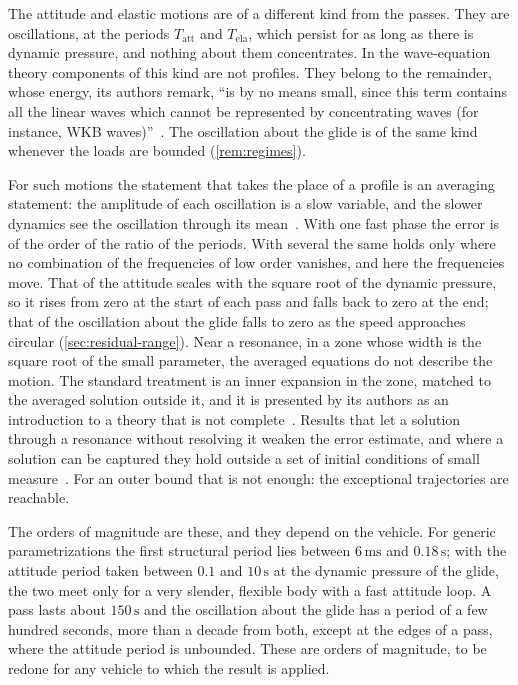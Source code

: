 The attitude and elastic motions are of a different kind from the passes.
They are oscillations, at the periods $T_{\mathrm{att}}$ and
$T_{\mathrm{ela}}$, which persist for as long as there is dynamic pressure,
and nothing about them concentrates. In the wave-equation theory components
of this kind are not profiles. They belong to the remainder, whose energy,
its authors remark, ``is by no means small, since this term contains all
the linear waves which cannot be represented by concentrating waves (for
instance, WKB waves)''~\cite[p.~136]{bahouri1999high}. The oscillation
about the glide is of the same kind whenever the loads are bounded
(\cref{rem:regimes}).

For such motions the statement that takes the place of a profile is an
averaging statement: the amplitude of each oscillation is a slow variable,
and the slower dynamics see the oscillation through its
mean~\cite[Ch.~10]{khalil2002nonlinear}. With one fast phase the error is
of the order of the ratio of the periods. With several the same holds only
where no combination of the frequencies of low order vanishes, and here the
frequencies move. That of the attitude scales with the square root of the
dynamic pressure, so it rises from zero at the start of each pass and falls
back to zero at the end; that of the oscillation about the glide falls to
zero as the speed approaches circular (\cref{sec:residual-range}). Near a
resonance, in a zone whose width is the square root of the small parameter,
the averaged equations do not describe the motion. The standard treatment
is an inner expansion in the zone, matched to the averaged solution outside
it, and it is presented by its authors as an introduction to a theory that
is not complete~\cite[Chs.~7--8]{sanders2007averaging}. Results that let a
solution through a resonance without resolving it weaken the error
estimate, and where a solution can be captured they hold outside a set of
initial conditions of small
measure~\cite[Sec.~7.4]{sanders2007averaging}. For an outer bound that is
not enough: the exceptional trajectories are reachable.

The orders of magnitude are these, and they depend on the vehicle. For
generic parametrizations the first structural period lies between
$6\,\mathrm{ms}$ and $0.18\,\mathrm{s}$; with the attitude period taken
between $0.1$ and $10\,\mathrm{s}$ at the dynamic pressure of the glide,
the two meet only for a very slender, flexible body with a fast attitude
loop. A pass lasts about $150\,\mathrm{s}$ and the oscillation about the
glide has a period of a few hundred seconds, more than a decade from both,
except at the edges of a pass, where the attitude period is unbounded.
These are orders of magnitude, to be redone for any vehicle to which the
result is applied.

